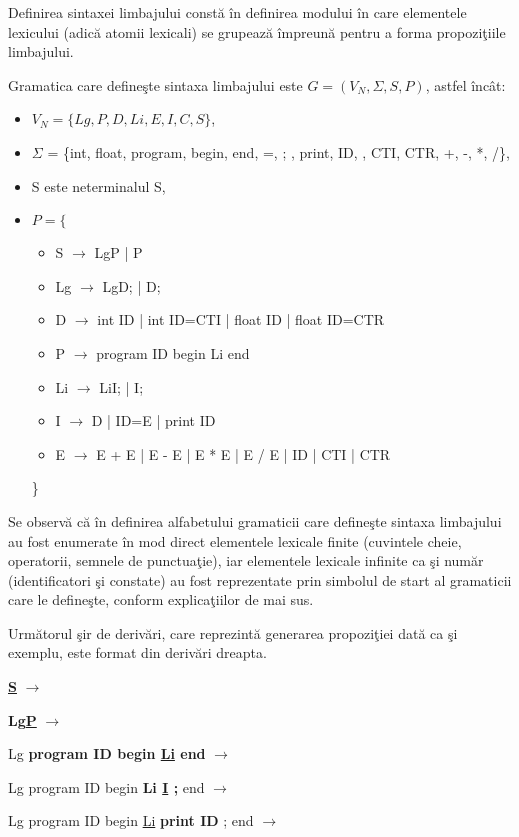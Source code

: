 Definirea sintaxei limbajului constă în definirea modului în care elementele lexicului (adică atomii lexicali) se grupează împreună pentru a forma propoziţiile limbajului. 

Gramatica care defineşte sintaxa limbajului este $G = (V_{N}, \Sigma, S, P)$, astfel încât:

\begin{itemize}
\item
$V_{N} = \{Lg,P,D,Li,E,I,C,S\}$,
\item
$\Sigma$ = \{int, float, program, begin, end, =, ; , print, ID,  , CTI, CTR, +, -, *, /\},
\item
S este neterminalul S,
\item
$P = \{$
\begin{itemize}
\item
S $\rightarrow$ LgP | P
\item
Lg $\rightarrow$ LgD; | D;
\item
D $\rightarrow$ int ID | int ID=CTI | float ID | float ID=CTR
\item
P $\rightarrow$ program ID begin Li end
\item
Li $\rightarrow$ LiI; | I;
\item
I $\rightarrow$ D | ID=E | print ID
\item
E $\rightarrow$ E + E | E - E | E * E | E / E | ID | CTI | CTR
\end{itemize}
\}
\end{itemize}

Se observă că în definirea alfabetului gramaticii care defineşte sintaxa limbajului au fost enumerate în mod direct elementele lexicale finite (cuvintele cheie, operatorii, semnele de punctuaţie), iar elementele lexicale infinite ca şi număr (identificatori şi constate) au fost reprezentate prin simbolul de start al gramaticii care le defineşte, conform explicaţiilor de mai sus.

Următorul şir de derivări, care reprezintă generarea propoziţiei dată ca şi exemplu, este format din derivări dreapta.

\textbf{\underline{S}} $\rightarrow$ 

\textbf{Lg\underline{P}} $\rightarrow$ 

Lg \textbf{program ID begin \underline{Li} end} $\rightarrow$ 

Lg program ID begin \textbf{Li \underline{I} ;} end $\rightarrow$

Lg program ID begin \underline{Li} \textbf{print ID} ; end $\rightarrow$ 

